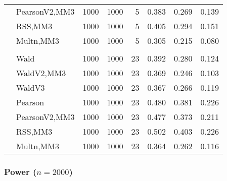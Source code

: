 \documentclass[
]{article}
\begin{document}
\begin{table}[H]
{\begin{tabular}[t]{llrrrrrr}
\hspace{1em} & PearsonV2,MM3 & 1000 & 1000 & 5 & 0.383 & 0.269 & 0.139\\

\hspace{1em} & RSS,MM3 & 1000 & 1000 & 5 & 0.405 & 0.294 & 0.151\\

\hspace{1em} & Multn,MM3 & 1000 & 1000 & 5 & 0.305 & 0.215 & 0.080\\
\cmidrule{1-8}
\addlinespace[0.3em]
\multicolumn{8}{l}{\textbf{3F 15V}}\\
\hspace{1em} & Wald & 1000 & 1000 & 23 & 0.392 & 0.280 & 0.124\\

\hspace{1em} & WaldV2,MM3 & 1000 & 1000 & 23 & 0.369 & 0.246 & 0.103\\

\hspace{1em} & WaldV3 & 1000 & 1000 & 23 & 0.367 & 0.266 & 0.119\\

\hspace{1em} & Pearson & 1000 & 1000 & 23 & 0.480 & 0.381 & 0.226\\

\hspace{1em} & PearsonV2,MM3 & 1000 & 1000 & 23 & 0.477 & 0.373 & 0.211\\

\hspace{1em} & RSS,MM3 & 1000 & 1000 & 23 & 0.502 & 0.403 & 0.226\\

\hspace{1em} & Multn,MM3 & 1000 & 1000 & 23 & 0.364 & 0.262 & 0.116\\
\bottomrule
\end{tabular}}
\end{table}

\hypertarget{power-n2000}{%
\subsubsection{\texorpdfstring{Power
(\(n=2000\))}{Power (n=2000)}}\label{power-n2000}}
\end{document}
